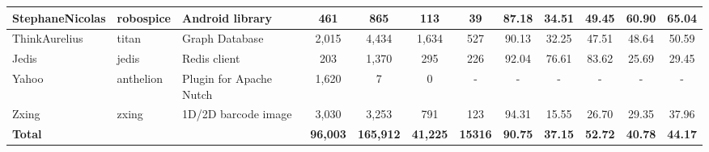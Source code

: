 \begin{landscape}
\begin{table}
\begin{tabular}{lllccccccccc}
StephaneNicolas             & robospice                                                     & Android library                                                          & 461             & 865              & 113                                                              & 39             & 87.18          & 34.51          & 49.45          & 60.90                                                             & 65.04                                                              \\ \hline
ThinkAurelius               & titan                                                         & Graph Database                                                           & 2,015           & 4,434             & 1,634                                                            & 527            & 90.13          & 32.25          & 47.51          & 48.64                                                             & 50.59                                                              \\ \hline
Jedis                       & jedis                                                         & Redis client                                                             & 203             & 1,370             & 295                                                              & 226            & 92.04          & 76.61          & 83.62          & 25.69                                                             & 29.45                                                              \\ \hline
Yahoo                       & anthelion                                                     & Plugin for Apache Nutch                                                  & 1,620            & 7                & 0                                                                & -              & -              & -              & -              & -                                                                 & -                                                                  \\ \hline
Zxing                       & zxing                                                         & 1D/2D barcode image                                                      & 3,030           & 3,253            & 791                                                              & 123            & 94.31          & 15.55          & 26.70          & 29.35                                                             & 37.96                                                              \\ \hline
\textbf{Total}              & \textbf{}                                                     & \textbf{}                                                                & \textbf{96,003} & \textbf{165,912} & \textbf{41,225}                                                  & \textbf{15316} & \textbf{90.75} & \textbf{37.15} & \textbf{52.72} & \textbf{40.78}                                                    & \textbf{44.17}                                                     \\ \hline
\end{tabular}%
\end{table}
\end{landscape}